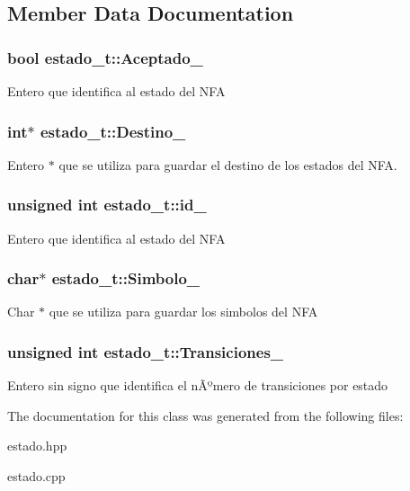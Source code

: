\subsection{Member Data Documentation}
\hypertarget{classestado__t_ada7ab9464df89cd55932c81d54a0a246}{
\subsubsection[{Aceptado\-\_\-}]{\setlength{\rightskip}{0pt plus 5cm}bool estado\-\_\-t\-::\-Aceptado\-\_\-}}\label{classestado__t_ada7ab9464df89cd55932c81d54a0a246}
Entero que identifica al estado del N\-F\-A \hypertarget{classestado__t_a2b1d0cb5028c3e687bc954c1dccb6fa5}{
\subsubsection[{Destino\-\_\-}]{\setlength{\rightskip}{0pt plus 5cm}int$\ast$ estado\-\_\-t\-::\-Destino\-\_\-}}\label{classestado__t_a2b1d0cb5028c3e687bc954c1dccb6fa5}
Entero $\ast$ que se utiliza para guardar el destino de los estados del N\-F\-A. \hypertarget{classestado__t_aba266da7e77f2633dc7296babf9893c9}{
\subsubsection[{id\-\_\-}]{\setlength{\rightskip}{0pt plus 5cm}unsigned int estado\-\_\-t\-::id\-\_\-}}\label{classestado__t_aba266da7e77f2633dc7296babf9893c9}
Entero que identifica al estado del N\-F\-A \hypertarget{classestado__t_af9afe7e6634f65b6e5e664810d5941d1}{
\subsubsection[{Simbolo\-\_\-}]{\setlength{\rightskip}{0pt plus 5cm}char$\ast$ estado\-\_\-t\-::\-Simbolo\-\_\-}}\label{classestado__t_af9afe7e6634f65b6e5e664810d5941d1}
Char $\ast$ que se utiliza para guardar los simbolos del N\-F\-A \hypertarget{classestado__t_af3db2b51130263e7a94d36018303bb48}{
\subsubsection[{Transiciones\-\_\-}]{\setlength{\rightskip}{0pt plus 5cm}unsigned int estado\-\_\-t\-::\-Transiciones\-\_\-}}\label{classestado__t_af3db2b51130263e7a94d36018303bb48}
Entero sin signo que identifica el nÃºmero de transiciones por estado 

The documentation for this class was generated from the following files\-:\begin{DoxyCompactItemize}
\item 
estado.\-hpp\item 
estado.\-cpp\end{DoxyCompactItemize}

